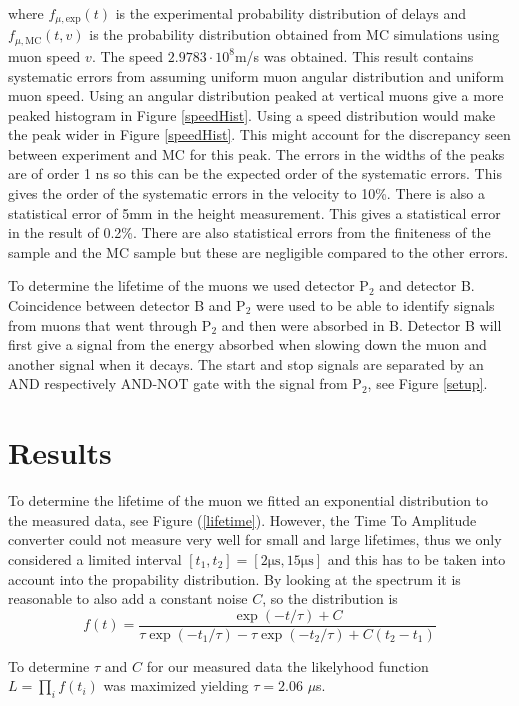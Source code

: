\documentclass[10pt,twocolumn]{article}
\begin{document}
where $f_{\mu,\mathrm{exp}}(t)$ is the experimental probability distribution of delays and $f_{\mu,\mathrm{MC}}(t,v)$ is the probability distribution obtained from MC simulations using muon speed $v$. The speed $2.9783\cdot10^8$m/s was obtained. This result contains systematic errors from assuming uniform muon angular distribution and uniform muon speed. Using an angular distribution peaked at vertical muons give a more peaked histogram in Figure \ref{speedHist}. Using a speed distribution would make the peak wider in Figure \ref{speedHist}. This might account for the discrepancy seen between experiment and MC for this peak. The errors in the widths of the peaks are of order 1 ns so this can be the expected order of the systematic errors. This gives the order of the systematic errors in the velocity to 10\%. There is also a statistical error of 5mm in the height measurement. This gives a statistical error in the result of 0.2\%. There are also statistical errors from the finiteness of the sample and the MC sample but these are negligible compared to the other errors.

To determine the lifetime of the muons we used detector P$_2$ and detector B. Coincidence between detector B and P$_2$ were used to be able to identify signals from muons that went through P$_2$ and then were absorbed in B. Detector B will first give a signal from the energy absorbed when slowing down the muon and another signal when it decays. The start and stop signals are separated by an AND respectively AND-NOT gate with the signal from P$_2$, see Figure \ref{setup}.

\section{Results}
To determine the lifetime of the muon we fitted an exponential distribution to the measured data, see Figure (\ref{lifetime}). However, the Time To Amplitude converter could not measure very well for small and large lifetimes, thus we only considered a limited interval $[t_1,t_2]=[2 \mathrm{\mu s},15  \mathrm{\mu s}]$ and this has to be taken into account into the propability distribution. By looking at the spectrum it is reasonable to also add a constant noise $C$, so the distribution is
\begin{equation}
f(t)=\frac{\exp{(-t/\tau)}+C}{\tau\exp{(-t_1/\tau)}-\tau\exp{(-t_2/\tau)}+C(t_2-t_1)}\label{pdf}
\end{equation}

To determine $\tau$ and $C$ for our measured data the likelyhood function $L=\prod_i f(t_i)$ was maximized yielding $\tau=2.06$ $\mu$s. \newline
\end{document}
